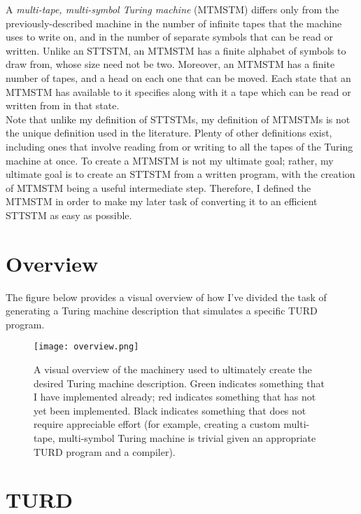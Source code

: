 \documentclass{article}
\begin{document}
A \emph{multi-tape, multi-symbol Turing machine} (MTMSTM) differs only from the previously-described machine in the number of infinite tapes that the machine uses to write on, and in the number of separate symbols that can be read or written. Unlike an STTSTM, an MTMSTM has a finite alphabet of symbols to draw from, whose size need not be two. Moreover, an MTMSTM has a finite number of tapes, and a head on each one that can be moved. Each state that an MTMSTM has available to it specifies along with it a tape which can be read or written from in that state. \\

Note that unlike my definition of STTSTMs, my definition of MTMSTMs is not the unique definition used in the literature. Plenty of other definitions exist, including ones that involve reading from or writing to all the tapes of the Turing machine at once. To create a MTMSTM is not my ultimate goal; rather, my ultimate goal is to create an STTSTM from a written program, with the creation of MTMSTM being a useful intermediate step. Therefore, I defined the MTMSTM in order to make my later task of converting it to an efficient STTSTM as easy as possible.

\section{Overview}

The figure below provides a visual overview of how I've divided the task of generating a Turing machine description that simulates a specific TURD program.

\begin{figure} 
\begin{center} 
\texttt{[image: overview.png]} 
\caption{A visual overview of the machinery used to ultimately create the desired Turing machine description. Green indicates something that I have implemented already; red indicates something that has not yet been implemented. Black indicates something that does not require appreciable effort (for example, creating a custom multi-tape, multi-symbol Turing machine is trivial given an appropriate TURD program and a compiler).\label{fig:Stupendous}} 
\end{center} 
\end{figure}

\section{TURD}
\end{document}

